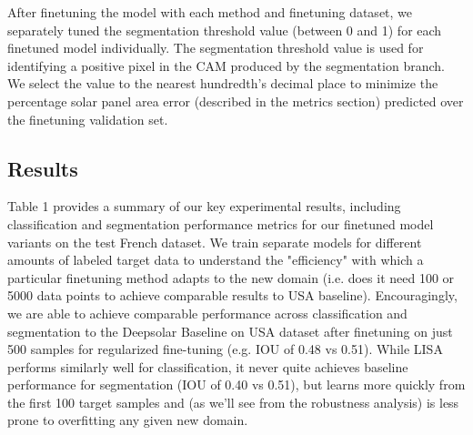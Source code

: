 \documentclass[10pt,twocolumn,letterpaper]{article}
\begin{document}
After finetuning the model with each method and finetuning dataset, we separately tuned the segmentation threshold value (between 0 and 1) for each finetuned model individually. The segmentation threshold value is used for identifying a positive pixel in the CAM produced by the segmentation branch. We select the value to the nearest hundredth's decimal place to minimize the percentage solar panel area error (described in the metrics section) predicted over the finetuning validation set. 


\subsection{Results}
Table 1 provides a summary of our key experimental results, including classification and segmentation performance metrics for our finetuned model variants on the test French dataset. We train separate models for different amounts of labeled target data to understand the "efficiency" with which a particular finetuning method adapts to the new domain (i.e. does it need 100 or 5000 data points to achieve comparable results to USA baseline). Encouragingly, we are able to achieve comparable performance across classification and segmentation to the Deepsolar Baseline on USA dataset after finetuning on just 500 samples for regularized fine-tuning (e.g. IOU of 0.48 vs 0.51). While LISA performs similarly well for classification, it never quite achieves baseline performance for segmentation (IOU of 0.40 vs 0.51), but learns more quickly from the first 100 target samples and (as we'll see from the robustness analysis) is less prone to overfitting any given new domain.
\end{document}
